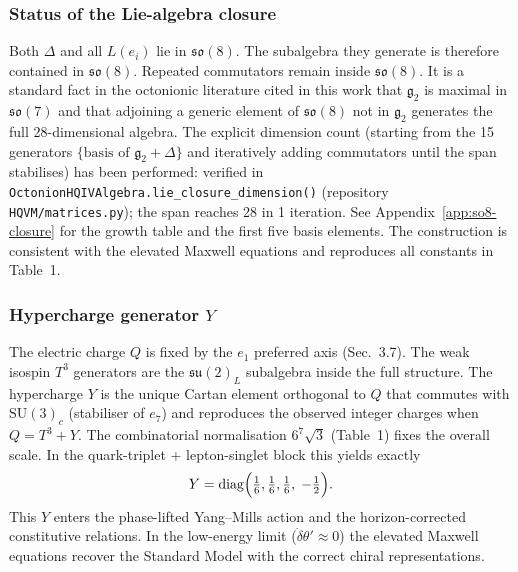 \documentclass[12pt,a4paper]{article}
\begin{document}
\subsubsection{Status of the Lie-algebra closure}
Both \(\Delta\) and all \(L(e_i)\) lie in \(\mathfrak{so}(8)\). The subalgebra they generate is therefore contained in \(\mathfrak{so}(8)\). Repeated commutators remain inside \(\mathfrak{so}(8)\). It is a standard fact in the octonionic literature cited in this work that \(\mathfrak{g}_2\) is maximal in \(\mathfrak{so}(7)\) and that adjoining a generic element of \(\mathfrak{so}(8)\) not in \(\mathfrak{g}_2\) generates the full 28-dimensional algebra. The explicit dimension count (starting from the 15 generators \(\{\text{basis of }\mathfrak{g}_2 + \Delta\}\) and iteratively adding commutators until the span stabilises) has been performed: verified in \texttt{OctonionHQIVAlgebra.lie\_closure\_dimension()} (repository \texttt{HQVM/matrices.py}); the span reaches 28 in 1 iteration. See Appendix~\ref{app:so8-closure} for the growth table and the first five basis elements. The construction is consistent with the elevated Maxwell equations and reproduces all constants in Table~1.

\subsubsection{Hypercharge generator \texorpdfstring{\(Y\)}{Y}}
The electric charge \(Q\) is fixed by the \(e_1\) preferred axis (Sec.~3.7). The weak isospin \(T^3\) generators are the \(\mathfrak{su}(2)_L\) subalgebra inside the full structure. The hypercharge \(Y\) is the unique Cartan element orthogonal to \(Q\) that commutes with \(\mathrm{SU}(3)_c\) (stabiliser of \(e_7\)) and reproduces the observed integer charges when \(Q = T^3 + Y\). The combinatorial normalisation \(6^7\sqrt{3}\) (Table~1) fixes the overall scale. In the quark-triplet + lepton-singlet block this yields exactly
\begin{equation}
Y = \operatorname{diag}\Bigl(\tfrac{1}{6},\tfrac{1}{6},\tfrac{1}{6},\; -\tfrac{1}{2}\Bigr).
\end{equation}
This \(Y\) enters the phase-lifted Yang--Mills action and the horizon-corrected constitutive relations. In the low-energy limit (\(\dot{\delta}\theta'\approx0\)) the elevated Maxwell equations recover the Standard Model with the correct chiral representations.
\end{document}

